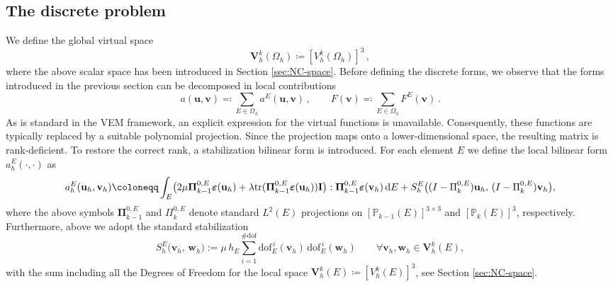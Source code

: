 \documentclass[a4paper,11pt]{article}
\theoremstyle{remark}
\theoremstyle{definition}
\newcounter{corr}
\newcommand{\PiZeroE}{\Pi^{0,E}_k}
\begin{document}
\subsection{The discrete problem}\label{sec:elast:discr}
We define the global virtual space 
\[
\mathbf{V}^k_h(\Omega_h) \coloneqq 
[V_h^k(\Omega_h)]^3 \, ,
\]
where the above scalar space has been introduced in Section \ref{sec:NC-space}.
Before defining the discrete forms, we observe that the forms introduced in the previous section can be decomposed in local contributions
\[
a(\mathbf{u}, \mathbf{v})
\eqqcolon \sum_{E \in \Omega_h}
a^E(\mathbf{u}, \mathbf{v}) \, ,
\qquad
F(\mathbf{v})
\eqqcolon \sum_{E \in \Omega_h}
F^E(\mathbf{v}) \, .
\]
As is standard in the VEM framework, an explicit expression for the virtual functions is unavailable. Consequently, these functions are typically replaced by a suitable polynomial projection. Since the projection maps onto a lower-dimensional space, the resulting matrix is rank-deficient. To restore the correct rank, a stabilization bilinear form is introduced.
For each element $E$ we define the local bilinear form $a_h^E(\cdot,\cdot)$ as
\begin{equation}\label{eq:ahe}
a_h^E(\mathbf{u}_h, \mathbf{v}_h)
\coloneqq
\int_E
\bigl(
2\mu \mathbf{\Pi}^{0,E}_{k-1}\boldsymbol{\varepsilon}(\mathbf{u}_h) + \lambda \text{tr}(\mathbf{\Pi}^{0,E}_{k-1}\boldsymbol{\varepsilon}(\mathbf{u}_h)) \mathbf{I}
\bigr)
: \mathbf{\Pi}^{0,E}_{k-1}\boldsymbol{\varepsilon}(\mathbf{v}_h) \, {\rm d }E
+
S_h^E\bigl(
(I - \PiZeroE) \mathbf{u}_h, \,
(I - \PiZeroE) \mathbf{v}_h
\bigr) ,
\end{equation}
where the above symbols $\mathbf{\Pi}^{0,E}_{k-1}$ and $\PiZeroE$ denote standard $L^2(E)$ projections on $[\mathbb{P}_{k-1}(E)]^{3 \times 3}$ and $[\mathbb{P}_{k}(E)]^{3}$, respectively.
Furthermore, above we adopt the standard stabilization 
\begin{equation}\label{eq:dofidofi}
S_h^E\bigl(\mathbf{v}_h , \, \mathbf{w}_h \bigr) := \mu \, 
h_E\sum_{i=1}^{\#\text{dof}} \text{dof}^{\,i}_E( \mathbf{v}_h) \, \text{dof}^{\,i}_E( \mathbf{w}_h) \qquad
\forall \mathbf{v}_h, \mathbf{w}_h \in \mathbf{V}^k_h(E) ,
\end{equation}
with the sum including all the Degrees of Freedom for the local space $\mathbf{V}^k_h(E) \coloneqq [V_h^k(E)]^3$, see Section 
\ref{sec:NC-space}.
\end{document}
